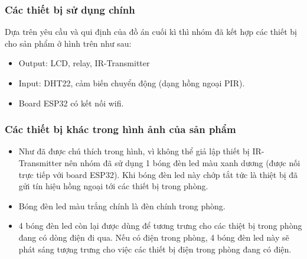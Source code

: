 \documentclass{report}
\begin{document}
\subsubsection{Các thiết bị sử dụng chính}
Dựa trên yêu cầu và qui định của đồ án cuối kì thì nhóm đã kết hợp các thiết bị cho sản phẩm ở hình trên như sau:
    \begin{itemize}
        \item Output: LCD, relay, IR-Transmitter
        \item Input: DHT22, cảm biến chuyển động (dạng hồng ngoại PIR).
        \item Board ESP32 có kết nối wifi.
    \end{itemize}

\subsubsection{Các thiết bị khác trong hình ảnh của sản phẩm}
\begin{itemize}
    \item Như đã được chú thích trong hình, vì không thể giả lập thiết bị IR-Transmitter nên nhóm đã sử dụng 1 bóng đèn led màu xanh dương (được nối trực tiếp với board ESP32). Khi bóng đèn led này chớp tắt tức là thiệt bị đã gửi tín hiệu hồng ngoại tới các thiết bị trong phòng.

    \item Bóng đèn led màu trắng chính là đèn chính trong phòng.

    \item 4 bóng đèn led còn lại được dùng để tương trưng cho các thiệt bị trong phòng đang có dòng điện đi qua. Nếu có điện trong phòng, 4 bóng đèn led này sẽ phát sáng tượng trưng cho việc các thiết bị điện trong phòng đang có điện.
\end{itemize}
\end{document}
